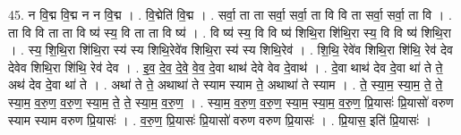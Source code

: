 \documentclass[17pt]{extarticle}
\begin{document}
45. न वि॒द्म वि॒द्म न न वि॒द्म । . वि॒द्मेति॑ वि॒द्म । . सर्वा॒ ता ता सर्वा॒ सर्वा॒ ता वि वि ता सर्वा॒ सर्वा॒ ता वि । . ता वि वि ता ता वि ष्य॑ स्य॒ वि ता ता वि ष्य॑ । . वि ष्य॑ स्य॒ वि वि ष्य॑ शिथि॒रा शि॑थि॒रा स्य॒ वि वि ष्य॑ शिथि॒रा । . स्य॒ शि॒थि॒रा शि॑थि॒रा स्य॑ स्य शिथि॒रेवे॑व शिथि॒रा स्य॑ स्य शिथि॒रेव॑ । . शि॒थि॒ रेवे॑व शिथि॒रा शि॑थि॒ रेव॑ देव देवेव शिथि॒रा शि॑थि॒ रेव॑ देव । . इ॒व॒ दे॒व॒ दे॒वे॒ वे॒व॒ दे॒वा थाथ॑ देवे वेव दे॒वाथ॑ । . दे॒वा थाथ॑ देव दे॒वा था॑ ते ते॒ अथ॑ देव दे॒वा था॑ ते । . अथा॑ ते ते॒ अथाथा॑ ते स्याम स्याम ते॒ अथाथा॑ ते स्याम । . ते॒ स्या॒म॒ स्या॒म॒ ते॒ ते॒ स्या॒म॒ व॒रु॒ण॒ व॒रु॒ण॒ स्या॒म॒ ते॒ ते॒ स्या॒म॒ व॒रु॒ण॒ । . स्या॒म॒ व॒रु॒ण॒ व॒रु॒ण॒ स्या॒म॒ स्या॒म॒ व॒रु॒ण॒ प्रि॒यासः॑ प्रि॒यासो॑ वरुण स्याम स्याम वरुण प्रि॒यासः॑ । . व॒रु॒ण॒ प्रि॒यासः॑ प्रि॒यासो॑ वरुण वरुण प्रि॒यासः॑ । . प्रि॒यास॒ इति॑ प्रि॒यासः॑ । \newline
\pagebreak
\end{document}
